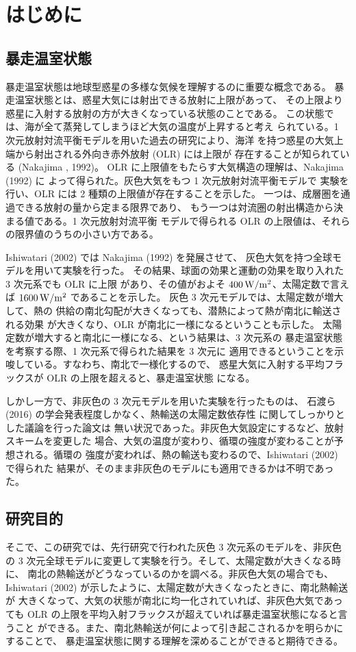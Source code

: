\documentclass[body]{subfiles}
\begin{document}
\chapter{はじめに}

\section{暴走温室状態}
暴走温室状態は地球型惑星の多様な気候を理解するのに重要な概念である。
暴走温室状態とは、惑星大気には射出できる放射に上限があって、
その上限より惑星に入射する放射の方が大きくなっている状態のことである。
この状態では、海が全て蒸発してしまうほど大気の温度が上昇すると考え
られている。1 次元放射対流平衡モデルを用いた過去の研究により、海洋
を持つ惑星の大気上端から射出される外向き赤外放射 (OLR) には上限が
存在することが知られている (Nakajima \etal*, 1992)。
OLR に上限値をもたらす大気構造の理解は、Nakajima \etal (1992) に
よって得られた。灰色大気をもつ 1 次元放射対流平衡モデルで
実験を行い、OLR には 2 種類の上限値が存在することを示した。
一つは、成層圏を通過できる放射の量から定まる限界であり、
もう一つは対流圏の射出構造から決まる値である。1 次元放射対流平衡
モデルで得られる OLR の上限値は、それらの限界値のうちの小さい方である。

Ishiwatari \etal (2002) では Nakajima \etal (1992) を発展させて、
灰色大気を持つ全球モデルを用いて実験を行った。
その結果、球面の効果と運動の効果を取り入れた 3 次元系でも OLR に上限
があり、その値がおよそ \(400\hmu{W/m^2}\)、太陽定数で言えば
\(1600\hmu{W/m^2}\) であることを示した。
灰色 3 次元モデルでは、太陽定数が増大して、熱の
供給の南北勾配が大きくなっても、潜熱によって熱が南北に輸送される効果
が大きくなり、OLR が南北に一様になるということも示した。
太陽定数が増大すると南北に一様になる、という結果は、3 次元系の
暴走温室状態を考察する際、1 次元系で得られた結果を 3 次元に
適用できるということを示唆している。すなわち、南北で一様化するので、
惑星大気に入射する平均フラックスが OLR の上限を超えると、暴走温室状態
になる。

しかし一方で、非灰色の 3 次元モデルを用いた実験を行ったものは、
石渡ら (2016) の学会発表程度しかなく、熱輸送の太陽定数依存性
に関してしっかりとした議論を行った論文は
無い状況であった。非灰色大気設定にするなど、放射スキームを変更した
場合、大気の温度が変わり、循環の強度が変わることが予想される。循環の
強度が変われば、熱の輸送も変わるので、Ishiwatari \etal (2002) で得られた
結果が、そのまま非灰色のモデルにも適用できるかは不明であった。

\section{研究目的}
そこで、この研究では、先行研究で行われた灰色 3 次元系のモデルを、非灰色の
3 次元全球モデルに変更して実験を行う。そして、太陽定数が大きくなる時に、
南北の熱輸送がどうなっているのかを調べる。非灰色大気の場合でも、Ishiwatari
\etal (2002) が示したように、太陽定数が大きくなったときに、南北熱輸送が
大きくなって、大気の状態が南北に均一化されていれば、非灰色大気であっても
OLR の上限を平均入射フラックスが超えていれば暴走温室状態になると言うこと
ができる。また、南北熱輸送が何によって引き起こされるかを明らかにすることで、
暴走温室状態に関する理解を深めることができると期待できる。
\end{document}
